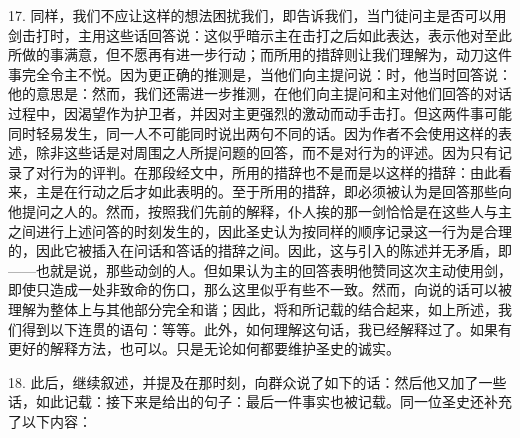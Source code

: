 17. 同样，我们不应让这样的想法困扰我们，即告诉我们，当门徒问主是否可以用剑击打时，主用这些话回答说：这似乎暗示主在击打之后如此表达，表示他对至此所做的事满意，但不愿再有进一步行动；而所用的措辞则让我们理解为，动刀这件事完全令主不悦。因为更正确的推测是，当他们向主提问说：时，他当时回答说：他的意思是：然而，我们还需进一步推测，在他们向主提问和主对他们回答的对话过程中，因渴望作为护卫者，并因对主更强烈的激动而动手击打。但这两件事可能同时轻易发生，同一人不可能同时说出两句不同的话。因为作者不会使用这样的表述，除非这些话是对周围之人所提问题的回答，而不是对行为的评述。因为只有记录了对行为的评判。在那段经文中，所用的措辞也不是而是以这样的措辞：由此看来，主是在行动之后才如此表明的。至于所用的措辞，即必须被认为是回答那些向他提问之人的。然而，按照我们先前的解释，仆人挨的那一剑恰恰是在这些人与主之间进行上述问答的时刻发生的，因此圣史认为按同样的顺序记录这一行为是合理的，因此它被插入在问话和答话的措辞之间。因此，这与引入的陈述并无矛盾，即——也就是说，那些动剑的人。但如果认为主的回答表明他赞同这次主动使用剑，即使只造成一处非致命的伤口，那么这里似乎有些不一致。然而，向说的话可以被理解为整体上与其他部分完全和谐；因此，将和所记载的结合起来，如上所述，我们得到以下连贯的语句：等等。此外，如何理解这句话，我已经解释过了。如果有更好的解释方法，也可以。只是无论如何都要维护圣史的诚实。\par

18. 此后，继续叙述，并提及在那时刻，向群众说了如下的话：然后他又加了一些话，如此记载：接下来是给出的句子：最后一件事实也被记载。同一位圣史还补充了以下内容：\par

